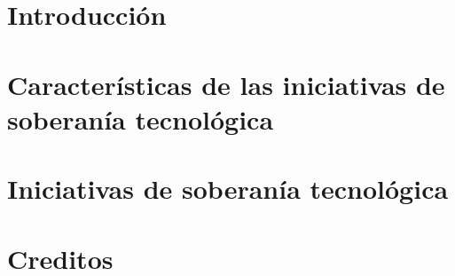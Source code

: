 \documentclass[a5paper,11pt]{book}
\begin{document}
\frontmatter
\pagestyle{empty}
\begin{center}
 \hspace{0pt}
  \vfill
  \vspace*{0.2\textheight}
  
  \vfill
 \hspace{0pt}
\end{center}
\pagebreak

\maketitle

\pagestyle{empty}


\pagestyle{fancy}

\tableofcontents
\thispagestyle{fancy}


\chapter{\prefacename}
\thispagestyle{fancy}


\mainmatter
\chapter{Introducción}
\thispagestyle{fancy}
 

\chapter{Características de las iniciativas de soberanía tecnológica}
 
 
 
 
 

\chapter{Iniciativas de soberanía tecnológica}
 
 
 
 
 

\chapter{Creditos}
 
\end{document}
